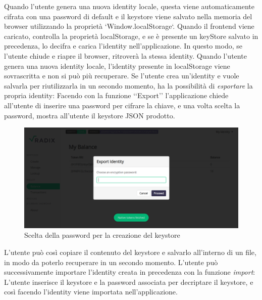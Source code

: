 Quando l'utente genera una nuova identity locale, questa viene automaticamente cifrata con una password di default e il keystore viene salvato nella memoria del browser utilizzando la proprietà `Window.localStorage`. Quando il frontend viene caricato, controlla la proprietà localStorage, e se è presente un keyStore salvato in precedenza, lo decifra e carica l'identity nell'applicazione. In questo modo, se l'utente chiude e riapre il browser, ritroverà la stessa identity. Quando l'utente genera una nuova identity locale, l'identity presente in localStorage viene sovrascritta e non si può più recuperare. Se l'utente crea un'identity e vuole salvarla per riutilizzarla in un secondo momento, ha la possibilità di \textit{esportare} la propria identity: Facendo con la funzione ‘‘Export’’ l'applicazione chiede all'utente di inserire una password per cifrare la chiave, e una volta scelta la password, mostra all'utente il keystore JSON prodotto. 

\begin{figure}[H]
    \includegraphics[width=\linewidth]{images/application/choose-password.png}
    \caption{Scelta della password per la creazione del keystore}
    \label{fig:choose_password}
\end{figure}

L'utente può così copiare il contenuto del keystore e salvarlo all'interno di un file, in modo da poterlo recuperare in un secondo momento. L'utente può successivamente importare l'identity creata in precedenza con la funzione \textit{import}: L'utente inserisce il keystore e la password associata per decriptare il keystore, e così facendo l'identity viene importata nell'applicazione.

